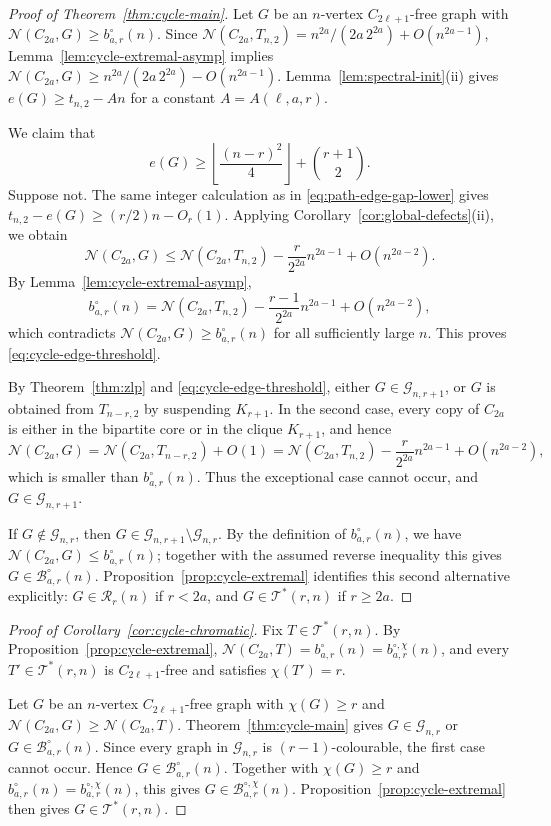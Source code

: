 \documentclass[11pt]{article}
\theoremstyle{definition}
\theoremstyle{plain}
\theoremstyle{remark}
\theoremstyle{plain}
\numberwithin{equation}{section}
\newcommand{\cG}{\mathcal G}
\newcommand{\cB}{\mathcal B}
\newcommand{\cT}{\mathcal T}
\newcommand{\cR}{\mathcal R}
\newcommand{\N}{\mathcal N}
\begin{document}
\begin{proof}[Proof of Theorem~\ref{thm:cycle-main}]
Let $G$ be an $n$-vertex $C_{2\ell+1}$-free graph with $\N(C_{2a},G)\ge b^{\circ}_{a,r}(n)$. Since $\N(C_{2a},T_{n,2})=n^{2a}/(2a\,2^{2a})+O(n^{2a-1})$, Lemma~\ref{lem:cycle-extremal-asymp} implies $\N(C_{2a},G)\ge n^{2a}/(2a\,2^{2a})-O(n^{2a-1})$. Lemma~\ref{lem:spectral-init}(ii) gives $e(G)\ge t_{n,2}-An$ for a constant $A=A(\ell,a,r)$.

We claim that
\begin{equation}\label{eq:cycle-edge-threshold}
        e(G)\ge \left\lfloor\frac{(n-r)^2}{4}\right\rfloor+\binom{r+1}{2}.
\end{equation}
Suppose not. The same integer calculation as in \eqref{eq:path-edge-gap-lower} gives $t_{n,2}-e(G)\ge (r/2)n-O_r(1)$.
Applying Corollary~\ref{cor:global-defects}(ii), we obtain
\[
        \N(C_{2a},G)\le \N(C_{2a},T_{n,2})-\frac{r}{2^{2a}}n^{2a-1}+O(n^{2a-2}).
\]
By Lemma~\ref{lem:cycle-extremal-asymp},
\[
        b^{\circ}_{a,r}(n)=\N(C_{2a},T_{n,2})-\frac{r-1}{2^{2a}}n^{2a-1}+O(n^{2a-2}),
\]
which contradicts $\N(C_{2a},G)\ge b^{\circ}_{a,r}(n)$ for all sufficiently large $n$. This proves \eqref{eq:cycle-edge-threshold}.

By Theorem~\ref{thm:zlp} and \eqref{eq:cycle-edge-threshold}, either $G\in\cG_{n,r+1}$, or $G$ is obtained from $T_{n-r,2}$ by suspending $K_{r+1}$. In the second case, every copy of $C_{2a}$ is either in the bipartite core or in the clique $K_{r+1}$, and hence
\[
        \N(C_{2a},G)=\N(C_{2a},T_{n-r,2})+O(1)
        =\N(C_{2a},T_{n,2})-\frac r{2^{2a}}n^{2a-1}+O(n^{2a-2}),
\]
which is smaller than $b^{\circ}_{a,r}(n)$. Thus the exceptional case cannot occur, and $G\in\cG_{n,r+1}$.

If $G\notin\cG_{n,r}$, then $G\in\cG_{n,r+1}\setminus\cG_{n,r}$. By the definition of $b^{\circ}_{a,r}(n)$, we have $\N(C_{2a},G)\le b^{\circ}_{a,r}(n)$; together with the assumed reverse inequality this gives $G\in\cB^{\circ}_{a,r}(n)$. Proposition~\ref{prop:cycle-extremal} identifies this second alternative explicitly: $G\in\cR_r(n)$ if $r<2a$, and $G\in\cT^*(r,n)$ if $r\ge2a$.
\end{proof}

\begin{proof}[Proof of Corollary~\ref{cor:cycle-chromatic}]
Fix $T\in \cT^*(r,n)$. By Proposition~\ref{prop:cycle-extremal}, $\N(C_{2a},T)=b^{\circ}_{a,r}(n)=b^{\circ,\chi}_{a,r}(n)$, and every $T'\in\cT^*(r,n)$ is $C_{2\ell+1}$-free and satisfies $\chi(T')=r$.

Let $G$ be an $n$-vertex $C_{2\ell+1}$-free graph with $\chi(G)\ge r$ and $\N(C_{2a},G)\ge \N(C_{2a},T)$. Theorem~\ref{thm:cycle-main} gives $G\in\cG_{n,r}$ or $G\in\cB^{\circ}_{a,r}(n)$. Since every graph in $\cG_{n,r}$ is $(r-1)$-colourable, the first case cannot occur. Hence $G\in\cB^{\circ}_{a,r}(n)$. Together with $\chi(G)\ge r$ and $b^{\circ}_{a,r}(n)=b^{\circ,\chi}_{a,r}(n)$, this gives $G\in\cB^{\circ,\chi}_{a,r}(n)$. Proposition~\ref{prop:cycle-extremal} then gives $G\in \cT^*(r,n)$.
\end{proof}
\end{document}
